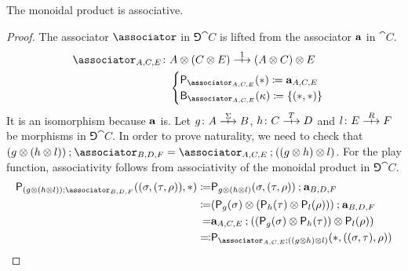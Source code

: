 \begin{lemma}
  The monoidal product is associative.
\end{lemma}
\begin{proof}
  The associator \(\associator\) in \(\Game{\cat{C}}\) is lifted from the associator \(\mathbf{a}\) in \(\cat{C}\).
  \begin{align*}
    \associator_{A,C,E} \colon & A \tensor (C \tensor E) \gamearrow{1} (A \tensor C) \tensor E \\
&\begin{cases}
\play{\associator_{A,C,E}}(\ast) \defn \aassociator_{A,C,E}\\
\best{\associator_{A,C,E}}(\kappa) \defn \{(\ast,\ast)\}
\end{cases}
\end{align*}
It is an isomorphism because \(\mathbf{a}\) is.
Let \(g \colon A \gamearrow{\Sigma} B\), \(h \colon C \gamearrow{T} D\) and \(l \colon E \gamearrow{R} F\) be morphisms in \(\Game{\cat{C}}\).
In order to prove naturality, we need to check that \((g \tensor (h \tensor l)) \dcomp \associator_{B,D,F} = \associator_{A,C,E} \dcomp ((g \tensor h) \tensor l)\).
For the play function, associativity follows from associativity of the monoidal product in \(\Game{\cat{C}}\).
\begin{align*}
  \play{(g \tensor (h \tensor l)) \dcomp \associator_{B,D,F}}((\sigma, (\tau, \rho)),\ast)
\defn& \play{g \tensor (h \tensor l)}(\sigma, (\tau, \rho)) \dcomp \aassociator_{B,D,F} \\
\defn& (\play{g}(\sigma) \tensor (\play{h}(\tau) \tensor \play{l}(\rho))) \dcomp \aassociator_{B,D,F} \\
=& \aassociator_{A,C,E} \dcomp ((\play{g}(\sigma) \tensor \play{h}(\tau)) \tensor \play{l}(\rho)) \\
\codefn& \play{\associator_{A,C,E} \dcomp ((g \tensor h) \tensor l)}(\ast,((\sigma, \tau), \rho)) \end{align*}


\end{proof}
